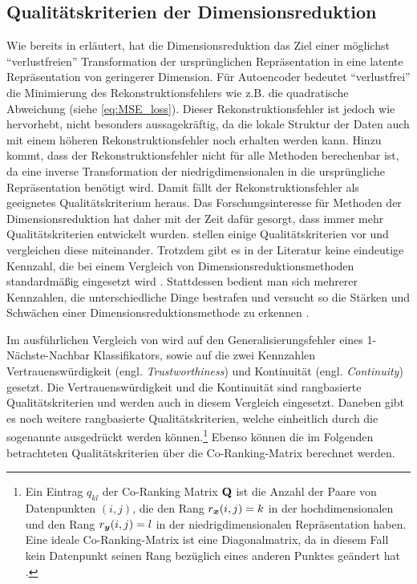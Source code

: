 \subsection{Qualitätskriterien der Dimensionsreduktion}
\label{ch:Vergleich:sec:Methodik:subsec:Qualitaetskriterien}
Wie bereits in  erläutert, hat die Dimensionsreduktion das Ziel einer möglichst \enquote{verlustfreien} Transformation der ursprünglichen Repräsentation in eine latente Repräsentation von geringerer Dimension. Für Autoencoder bedeutet \enquote{verlustfrei} die Minimierung des Rekonstruktionsfehlers wie z.B. die quadratische Abweichung (siehe \eqref{eq:MSE_loss}). Dieser Rekonstruktionsfehler ist jedoch wie \textcite[18]{vanderMaaten.2009} hervorhebt, nicht besonders aussagekräftig, da die lokale Struktur der Daten auch mit einem höheren Rekonstruktionsfehler noch erhalten werden kann. Hinzu kommt, dass der Rekonstruktionsfehler nicht für alle Methoden berechenbar ist, da eine inverse Transformation der niedrigdimensionalen in die ursprüngliche Repräsentation benötigt wird. Damit fällt der Rekonstruktionsfehler als geeignetes Qualitätskriterium heraus. Das Forschungsinteresse für Methoden der Dimensionsreduktion hat daher mit der Zeit dafür gesorgt, dass immer mehr Qualitätskriterien entwickelt wurden. \textcite{Gracia.2014} stellen einige Qualitätskriterien vor und vergleichen diese miteinander. Trotzdem gibt es in der Literatur keine eindeutige Kennzahl, die bei einem Vergleich von Dimensionsreduktionsmethoden standardmäßig eingesetzt wird \parencite[vgl.][1 -- 2]{Lee.2009}. Stattdessen bedient man sich mehrerer Kennzahlen, die
unterschiedliche Dinge bestrafen und versucht so die Stärken und Schwächen einer
Dimensionsreduktionsmethode zu erkennen \parencite[486]{Venna.2001}.

Im ausführlichen Vergleich von \textcite{vanderMaaten.2009} wird auf den Generalisierungsfehler
eines 1-Nächste-Nachbar Klassifikators, sowie auf die zwei Kennzahlen Vertrauenswürdigkeit (engl.
\textit{Trustworthiness}) und Kontinuität (engl. \textit{Continuity}) \parencites{Venna.2001}{Venna.2006} gesetzt. Die Vertrauenswürdigkeit und die Kontinuität sind
rangbasierte Qualitätskriterien und werden auch in diesem Vergleich eingesetzt. Daneben gibt es
noch weitere rangbasierte Qualitätskriterien, welche einheitlich durch die sogenannte
 \parencite[1432]{Lee.2009} ausgedrückt werden können.\footnote{ Ein Eintrag $q_{kl}$ der Co-Ranking
	Matrix $\mathbf{Q}$ ist die Anzahl der Paare von Datenpunkten $(i, j)$, die den Rang $r_{\bm{x}}(i,
		j) = k$ in der hochdimensionalen und den Rang $r_{\bm{y}}(i, j) = l$ in der niedrigdimensionalen
	Repräsentation haben. Eine ideale Co-Ranking-Matrix ist eine Diagonalmatrix, da in diesem Fall kein
	Datenpunkt seinen Rang bezüglich eines anderen Punktes geändert hat \parencite[1432]{Lee.2009}. } Ebenso können die im Folgenden betrachteten Qualitätskriterien über die
Co-Ranking-Matrix berechnet werden.

